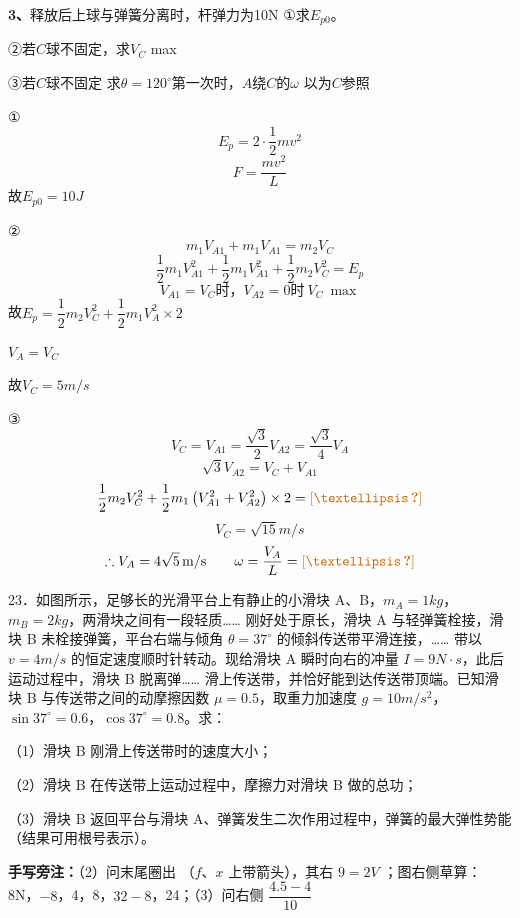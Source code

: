 \begin{problem}[3]
\textbf{3、}释放后上球与弹簧分离时，杆弹力为10N
①求$E_{p0}$。

②若$C$球不固定，求$V_C$ max

③若$C$球不固定 求$\theta=120^\circ$第一次时，$A$绕$C$的$\omega$
以为$C$参照
\begin{solution}
①
\[ E_p=2\cdot\dfrac{1}{2}mv^2 \]
\[ F=\dfrac{mv^2}{L} \]
故$E_{p0}=10\unit{J}$

②
\[ m_1V_{A1}+m_1V_{A1}=m_2V_C \]
\[ \dfrac{1}{2}m_1V_{A1}^2+\dfrac{1}{2}m_1V_{A1}^2+\dfrac{1}{2}m_2V_C^2=E_p \] %
\[ V_{A1}=V_C\text{时，}V_{A2}=0\text{时}\ V_C\ \max \]
故$E_p=\dfrac{1}{2}m_2V_C^2+\dfrac{1}{2}m_1V_A^2\times2$

$V_A=V_C$

故$V_C=5\unit{m/s}$

③
\[ V_C=V_{A1}=\dfrac{\sqrt{3}}{2}V_{A2}=\dfrac{\sqrt{3}}{4}V_A \]
\[ \sqrt{3}V_{A2}=V_C+V_{A1} \]
\[ \dfrac{1}{2}m_2V_C^2+\dfrac{1}{2}m_1\left(V_{A1}^2+V_{A2}^2\right)\times2=\unclear{…} \] %
\[ V_C=\sqrt{15}\unit{m/s} \]
\[ \therefore V_A=4\sqrt{5}\unit{m/s}\qquad \omega=\dfrac{V_A}{L}=\unclear{…} \] %
\end{solution}
\end{problem}

\begin{problem}[粘贴印刷题 23]
23．如图所示，足够长的光滑平台上有静止的小滑块 A、B，$m_A=1\unit{kg}$，$m_B=2\unit{kg}$，两滑块之间有一段轻质……%
刚好处于原长，滑块 A 与轻弹簧栓接，滑块 B 未栓接弹簧，平台右端与倾角 $\theta=37^\circ$ 的倾斜传送带平滑连接，……%
带以 $v=4\unit{m/s}$ 的恒定速度顺时针转动。现给滑块 A 瞬时向右的冲量 $I=9\unit{N\cdot s}$，此后运动过程中，滑块 B 脱离弹……%
滑上传送带，并恰好能到达传送带顶端。已知滑块 B 与传送带之间的动摩擦因数 $\mu=0.5$，取重力加速度 $g=10\unit{m/s^2}$，$\sin37^\circ=0.6$，$\cos37^\circ=0.8$。求：

（1）滑块 B 刚滑上传送带时的速度大小；

（2）滑块 B 在传送带上运动过程中，摩擦力对滑块 B 做的总功；

（3）滑块 B 返回平台与滑块 A、弹簧发生二次作用过程中，弹簧的最大弹性势能（结果可用根号表示）。


\medskip
\noindent\textbf{手写旁注：}（2）问末尾圈出 （$f$、$x$ 上带箭头），其右 $9=2V$%
；图右侧草算：8N，$-8$，4，8，$32-8$，24；（3）问右侧 $\dfrac{4.5-4}{10}$
\end{problem}


